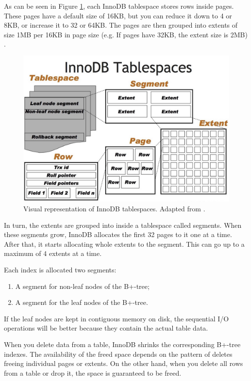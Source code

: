 \documentclass[12pt]{article}
\begin{document}
As can be seen in Figure \ref{tablespaceImage}, each InnoDB tablespace stores rows inside pages. These pages have a default size of 16KB, but you can reduce it down to 4 or 8KB, or increase it to 32 or 64KB. 
The pages are then grouped into extents of size 1MB per 16KB in page size (e.g. If pages have 32KB, the extent size is 2MB) \parencite{FileSpaceManagement}.

\begin{figure}[h]
\centering
    \includegraphics[scale=0.3]{files/tablespace.jpeg}
    \caption{Visual representation of InnoDB tablespaces. Adapted from \parencite{tablespaceImageLink}.}
    \label{tablespaceImage}
\end{figure}

In turn, the extents are grouped into  inside a tablespace called segments. When these segments grow, InnoDB allocates the first 32 pages to it one at a time. After that, it starts allocating whole extents to the segment. This can go up to a maximum of 4 extents at a time.

Each index is allocated two segments:
\begin{enumerate}
    \item A segment for non-leaf nodes of the B+-tree;
    \item A segment for the leaf nodes of the B+-tree.
\end{enumerate}



If the leaf nodes are kept in contiguous memory on disk, the sequential I/O operations will be better because they contain the actual table data.

When you delete data from a table, InnoDB shrinks the corresponding B+-tree indexes. The availability of the freed space depends on the pattern of deletes freeing individual pages or extents. On the other hand, when you delete all rows from a table or drop it, the space is guaranteed to be freed. 
\end{document}
